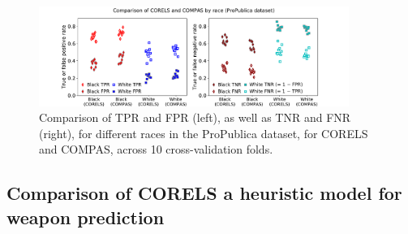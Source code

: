 \begin{figure}[t!]
\begin{center}
\includegraphics[trim={35mm, 0mm, 40mm, 0mm},
width=0.9\textwidth]{figs/compare_corels_compas.pdf}
\end{center}
\caption{Comparison of TPR and FPR (left), as well as TNR and FNR (right),
for different races in the ProPublica dataset, for CORELS and COMPAS,
across 10 cross-validation folds.
%
%
%
}
\label{fig:tpr-fpr}
\end{figure}

\subsection{Comparison of CORELS a heuristic model for weapon prediction}
\label{sec:frisk}

